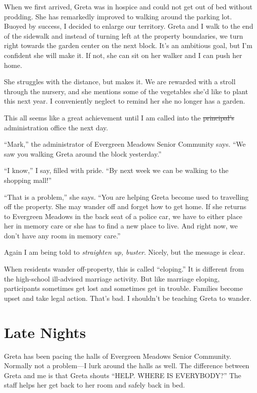 \documentclass[
  letterpaper,
  DIV=11,
  numbers=noendperiod]{scrreprt}
\begin{document}

When we first arrived, Greta was in hospice and could not get out of bed
without prodding. She has remarkedly improved to walking around the
parking lot. Buoyed by success, I decided to enlarge our territory.
Greta and I walk to the end of the sidewalk and instead of turning left
at the property boundaries, we turn right towards the garden center on
the next block. It's an ambitious goal, but I'm confident she will make
it. If not, she can sit on her walker and I can push her home.

She struggles with the distance, but makes it. We are rewarded with a
stroll through the nursery, and she mentions some of the vegetables
she'd like to plant this next year. I conveniently neglect to remind her
she no longer has a garden.

This all seems like a great achievement until I am called into the
\st{principal's} administration office the next day.

``Mark,'' the administrator of Evergreen Meadows Senior Community says.
``We saw you walking Greta around the block yesterday.''

``I know,'' I say, filled with pride. ``By next week we can be walking
to the shopping mall!''

``That is a problem,'' she says. ``You are helping Greta become used to
travelling off the property. She may wander off and forget how to get
home. If she returns to Evergreen Meadows in the back seat of a police
car, we have to either place her in memory care or she has to find a new
place to live. And right now, we don't have any room in memory care.''

Again I am being told to \emph{straighten up, buster}. Nicely, but the
message is clear.

When residents wander off-property, this is called ``eloping.'' It is
different from the high-school ill-advised marriage activity. But like
marriage eloping, participants sometimes get lost and sometimes get in
trouble. Families become upset and take legal action. That's bad. I
shouldn't be teaching Greta to wander.

\section*{Late Nights}\label{late-nights}


Greta has been pacing the halls of Evergreen Meadows Senior Community.
Normally not a problem---I lurk around the halls as well. The difference
between Greta and me is that Greta shouts ``HELP. WHERE IS EVERYBODY?''
The staff helps her get back to her room and safely back in bed.
\end{document}
